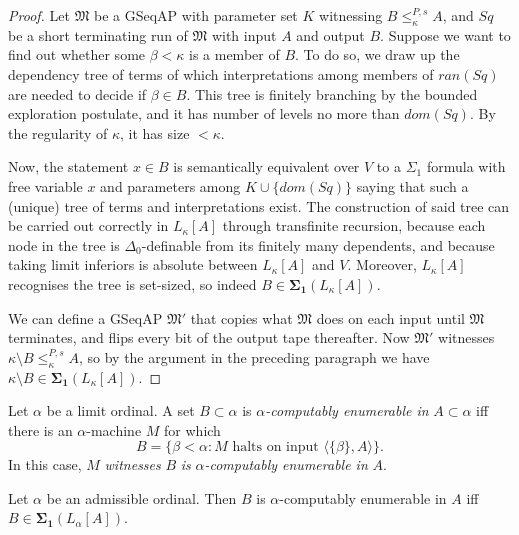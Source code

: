 \documentclass[12pt]{article}
\numberwithin{equation}{section}
\begin{document}
\begin{proof}
Let $\mathfrak{M}$ be a GSeqAP with parameter set $K$ witnessing $B \leq^{P, s}_{\kappa} A$, and $Sq$ be a short terminating run of $\mathfrak{M}$ with input $A$ and output $B$. Suppose we want to find out whether some $\beta < \kappa$ is a member of $B$. To do so, we draw up the dependency tree of terms of which interpretations among members of $ran(Sq)$ are needed to decide if $\beta \in B$. 
This tree is finitely branching by the bounded exploration postulate, and it has number of levels no more than $dom(Sq)$. By the regularity of $\kappa$, it has size $< \kappa$. 

Now, the statement $x \in B$ is semantically equivalent over $V$ to a $\Sigma_1$ formula with free variable $x$ and parameters among $K \cup \{dom(Sq)\}$ saying that such a (unique) tree of terms and interpretations exist. The construction of said tree can be carried out correctly in $L_{\kappa}[A]$ through transfinite recursion, because each node in the tree is $\Delta_0$-definable from its finitely many dependents, and because taking limit inferiors is absolute between $L_{\kappa}[A]$ and $V$. Moreover, $L_{\kappa}[A]$ recognises the tree is set-sized, so indeed $B \in \mathbf{\Sigma_1}(L_{\kappa}[A])$.

We can define a GSeqAP $\mathfrak{M}'$ that copies what $\mathfrak{M}$ does on each input until $\mathfrak{M}$ terminates, and flips every bit of the output tape thereafter. Now $\mathfrak{M}'$ witnesses $\kappa \setminus B \leq^{P, s}_{\kappa} A$, so by the argument in the preceding paragraph we have $\kappa \setminus B \in \mathbf{\Sigma_1}(L_{\kappa}[A])$.
\end{proof}

\begin{defi}
Let $\alpha$ be a limit ordinal. A set $B \subset \alpha$ is $\alpha$\emph{-computably enumerable in} $A \subset \alpha$ iff there is an $\alpha$-machine $M$ for which
\begin{equation*}
    B = \{\beta < \alpha : M \text{ halts on input } \langle \{\beta\}, A \rangle\} \text{.}
\end{equation*}
In this case, $M$ \emph{witnesses} $B$ \emph{is} $\alpha$\emph{-computably enumerable in} $A$.
\end{defi}

\begin{fact}\label{fact272}
Let $\alpha$ be an admissible ordinal. Then $B$ is $\alpha$-computably enumerable in $A$ iff $B \in \mathbf{\Sigma_1}(L_{\alpha}[A])$.
\end{fact}
\end{document}
